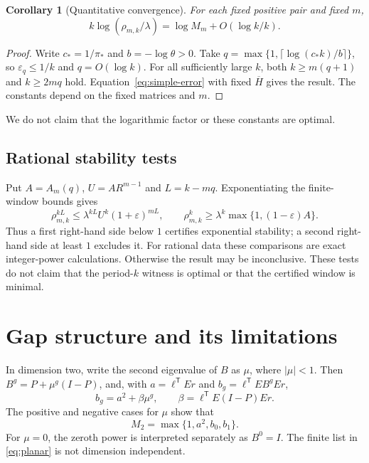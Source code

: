 \documentclass[11pt,letterpaper]{article}
\newtheorem{corollary}[theorem]{Corollary}
\theoremstyle{remark}
\newcommand{\transpose}{^{\mathsf T}}
\begin{document}
\begin{corollary}[Quantitative convergence]\label{cor:quant-rate}
For each fixed positive pair and fixed $m$,
\[
 k\log(\rho_{m,k}/\lambda)=\log M_m+O(\log k/k).
\]
\end{corollary}
\begin{proof}
Write $c_*=1/\pi_*$ and $b=-\log\theta>0$. Take
$q=\max\{1,\lceil\log(c_*k)/b\rceil\}$, so
$\varepsilon_q\le1/k$ and $q=O(\log k)$.
For all sufficiently large $k$, both $k\ge m(q+1)$ and $k\ge2mq$ hold.
Equation~\eqref{eq:simple-error} with fixed $\overline H$ gives the result.
The constants depend on the fixed matrices and $m$.
\end{proof}
We do not claim that the logarithmic factor or these constants are optimal.

\subsection{Rational stability tests}

Put $A=A_m(q)$, $U=AR^{m-1}$ and $L=k-mq$. Exponentiating the finite-window
bounds gives
\[
 \rho_{m,k}^{kL}\le\lambda^{kL}U^k(1+\varepsilon)^{mL},\qquad
 \rho_{m,k}^{k}\ge\lambda^k\max\{1,(1-\varepsilon)A\}.
\]
Thus a first right-hand side below $1$ certifies exponential stability;
a second right-hand side at least $1$ excludes it. For rational data these
comparisons are exact integer-power calculations. Otherwise the result
may be inconclusive. These tests do not claim that the period-$k$ witness
is optimal or that the certified window is minimal.

\section{Gap structure and its limitations}

In dimension two, write the second eigenvalue of $B$ as $\mu$, where
$|\mu|<1$. Then $B^g=P+\mu^g(I-P)$, and, with
$a=\ell\transpose Er$ and $b_g=\ell\transpose EB^gEr$,
\[
 b_g=a^2+\beta\mu^g,\qquad
 \beta=\ell\transpose E(I-P)Er.
\]
The positive and negative cases for $\mu$ show that
\begin{equation}\label{eq:planar}
 M_2=\max\{1,a^2,b_0,b_1\}.
\end{equation}
For $\mu=0$, the zeroth power is interpreted separately as $B^0=I$.
The finite list in \eqref{eq:planar} is not dimension independent.
\end{document}
